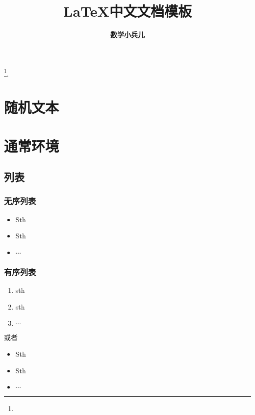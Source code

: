 \documentclass[a4paper, 12pt, UTF8]{ctexart}
\begin{document}
\title{\bf \LaTeX 中文文档模板} \author{\bf
  \href{https://matnoble.me/about/}{数学小兵儿}}
\date{}

\maketitle
\tableofcontents
\footnote{\noindent {} \newline
  \updatetext{\today}}.

\clearpage
\listoflistings

\clearpage

\section{随机文本}
\zhlipsum[2-3]

\clearpage

\section{通常环境}

\subsection{列表}

\subsubsection{无序列表}
\begin{itemize}
    \item Sth
    \item Sth
    \item $\cdots$
\end{itemize}
\subsubsection{有序列表}
\begin{enumerate}
    \item sth
    \item sth
    \item $\cdots$
\end{enumerate}
或者
\begin{itemize}
    \item[(1)] Sth
    \item[(2)] Sth
    \item[(3)] $\cdots$
\end{itemize}
\end{document}
